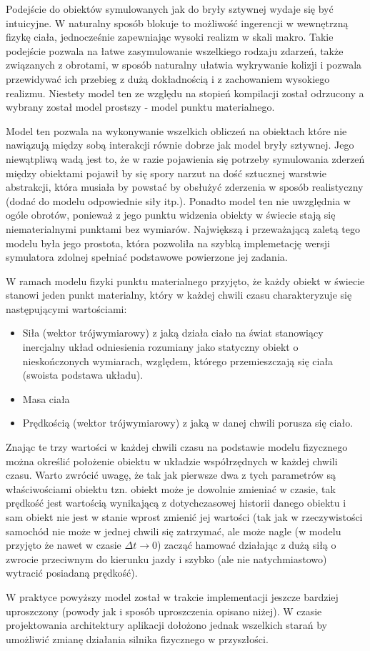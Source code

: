 \par{
Podejście do obiektów symulowanych jak do bryły sztywnej wydaje się być intuicyjne. W naturalny sposób blokuje to możliwość ingerencji w wewnętrzną fizykę ciała, jednocześnie zapewniając wysoki realizm w skali makro.
Takie podejście pozwala na łatwe zasymulowanie wszelkiego rodzaju zdarzeń, także związanych z obrotami, w sposób naturalny ułatwia wykrywanie kolizji i pozwala przewidywać ich przebieg z dużą dokładnością i z zachowaniem wysokiego realizmu.
Niestety model ten ze względu na stopień kompilacji został odrzucony a wybrany został model prostszy - model punktu materialnego.
\par{
Model ten pozwala na wykonywanie wszelkich obliczeń na obiektach które nie nawiązują między sobą interakcji równie dobrze jak model bryły sztywnej. Jego niewątpliwą wadą jest to, że w razie pojawienia się potrzeby symulowania zderzeń między obiektami pojawił by się spory narzut na dość sztucznej warstwie abstrakcji, która musiała by powstać by obsłużyć zderzenia w sposób realistyczny (dodać do modelu odpowiednie siły itp.).
Ponadto model ten nie uwzględnia w ogóle obrotów, ponieważ z jego punktu widzenia obiekty w świecie stają się niematerialnymi punktami bez wymiarów.
Największą i przeważającą zaletą tego modelu była jego prostota, która pozwoliła na szybką implemetację wersji symulatora zdolnej spełniać podstawowe powierzone jej zadania. 
}
\par{
W ramach modelu fizyki punktu materialnego przyjęto, że każdy obiekt w świecie stanowi jeden punkt materialny, który w każdej chwili czasu charakteryzuje się następującymi wartościami:
\begin{itemize}
\item Siła (wektor trójwymiarowy) z jaką działa ciało na świat stanowiący inercjalny układ odniesienia rozumiany jako statyczny obiekt o nieskończonych wymiarach, względem, którego przemieszczają się ciała (swoista podstawa układu).
\item Masa ciała
\item Prędkością (wektor trójwymiarowy) z jaką w danej chwili porusza się ciało.
\end{itemize}
Znając te trzy wartości w każdej chwili czasu na podstawie modelu fizycznego można określić położenie obiektu w układzie współrzędnych w każdej chwili czasu.
Warto zwrócić uwagę, że tak jak pierwsze dwa z tych parametrów są właściwościami obiektu tzn. obiekt może je dowolnie zmieniać w czasie, tak prędkość jest wartością wynikającą z dotychczasowej historii danego obiektu i sam obiekt nie jest w stanie wprost zmienić jej wartości (tak jak w rzeczywistości samochód nie może w jednej chwili się zatrzymać, ale może nagle (w modelu przyjęto że nawet w czasie $\Delta t \longrightarrow 0$) zacząć hamować działając z dużą siłą o zwrocie przeciwnym do kierunku jazdy i szybko (ale nie natychmiastowo) wytracić posiadaną prędkość).
}
\par
{
W praktyce powyższy model został w trakcie implementacji jeszcze bardziej uproszczony (powody jak i sposób uproszczenia opisano niżej). W czasie projektowania architektury aplikacji dołożono jednak wszelkich starań by umożliwić zmianę działania silnika fizycznego w przyszłości.
}

}
